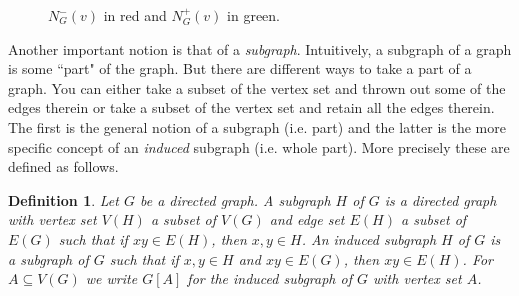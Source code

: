 \documentclass[12pt]{kluwer}
\newtheorem{defn}{Definition}
\theoremstyle{remark}
\begin{document}
\begin{figure}[ht]
\centering
{}
\caption{$N^{-}_G(v)$ in red and $N^{+}_G(v)$ in green.}
\end{figure}

Another important notion is that of a \textit{subgraph}. Intuitively, a subgraph of a graph is some ``part" of the graph. But there are different ways to take a part of a graph. You can either take a subset of the vertex set and thrown out some of the edges therein or take a subset of the vertex set and retain all the edges therein. The first is the general notion of a subgraph (i.e. part) and the latter is the more specific concept of an \textit{induced} subgraph (i.e. whole part). More precisely these are defined as follows.

\begin{defn}
Let $G$ be a directed graph.  A \emph{subgraph} $H$ of $G$ is a directed graph with vertex set $V(H)$ a subset of $V(G)$ and edge set $E(H)$ a subset of $E(G)$ such that if $xy \in E(H)$, then $x, y \in H$.  An \emph{induced subgraph} $H$ of $G$ is a subgraph of $G$ such that if $x,y \in H$ and $xy \in E(G)$, then $xy \in E(H)$.  For $A \subseteq V(G)$ we write $G[A]$ for the induced subgraph of $G$ with vertex set $A$.
\end{defn}
\end{document}
